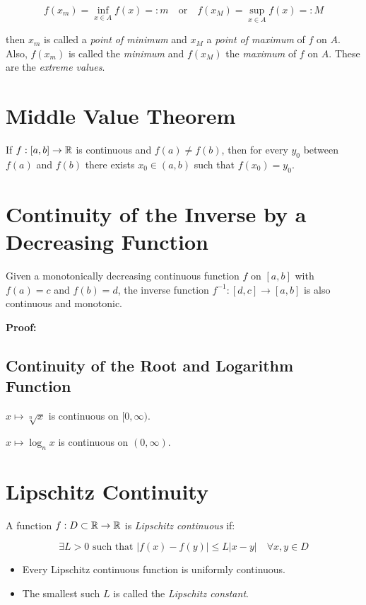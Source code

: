 \[
    f(x_m) = \inf_{x \in A} f(x) =: m \quad \text{or} \quad f(x_M) = \sup_{x \in A} f(x) =: M
\] 

then \(x_m\) is called a \emph{point of minimum} and \(x_M\) a \emph{point of maximum} of \(f\) on \(A\). Also, 
\(f(x_m)\) is called the \emph{minimum} and \(f(x_M)\) the \emph{maximum} of \(f\) on \(A\). These are the 
\emph{extreme values}.

\section{Middle Value Theorem}

If \(f: [a, b] \to \mathbb{R}\) is continuous and \(f(a) \ne f(b)\), then for every \(y_0\) between \(f(a)\) and \(f(b)\) 
there exists \(x_0 \in (a, b)\) such that \(f(x_0) = y_0\).

\section{Continuity of the Inverse by a Decreasing Function}

Given a monotonically decreasing continuous function \(f\) on \([a, b]\) with \(f(a) = c\) and \(f(b) = d\), the inverse function 
\(f^{-1}: [d, c] \to [a, b]\) is also continuous and monotonic.

\textbf{Proof:}

\subsection{Continuity of the Root and Logarithm Function}

\(x \mapsto \sqrt[n]{x}\) is continuous on \([0, \infty)\).

\(x \mapsto \log_n{x}\) is continuous on \((0, \infty)\).

\section{Lipschitz Continuity}

A function \(f: D \subset \mathbb{R} \to \mathbb{R}\) is \emph{Lipschitz continuous} if:

\[
    \exists L > 0 \text{ such that } |f(x) - f(y)| \le L |x - y| \quad \forall x, y \in D
\]

\begin{itemize}

    \item Every Lipschitz continuous function is uniformly continuous.

    \item The smallest such \(L\) is called the \emph{Lipschitz constant}.

\end{itemize}

